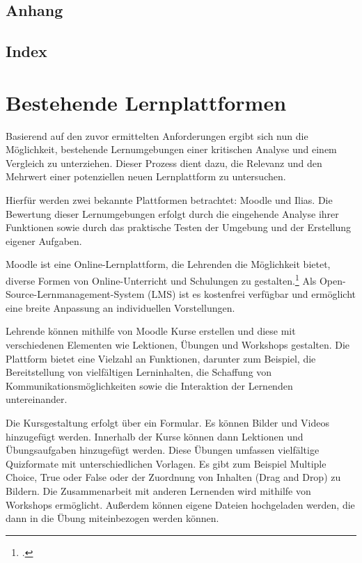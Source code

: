 \subsection{Anhang}
\subsection{Index}

\section{Bestehende Lernplattformen}
Basierend auf den zuvor ermittelten Anforderungen ergibt sich nun die Möglichkeit, bestehende Lernumgebungen einer kritischen Analyse und einem Vergleich zu unterziehen. Dieser Prozess dient dazu, die Relevanz und den Mehrwert einer potenziellen neuen Lernplattform zu untersuchen.

Hierfür werden zwei bekannte Plattformen betrachtet: Moodle und Ilias.
Die Bewertung dieser Lernumgebungen erfolgt durch die eingehende Analyse ihrer Funktionen sowie durch das praktische Testen der Umgebung und der Erstellung eigener Aufgaben.

Moodle ist eine Online-Lernplattform, die Lehrenden die Möglichkeit bietet, diverse Formen von Online-Unterricht und Schulungen zu gestalten.\footcite[Vgl.][]{moodle}{}{}
Als Open-Source-Lernmanagement-System (LMS) ist es kostenfrei verfügbar und ermöglicht eine breite Anpassung an individuellen Vorstellungen.

Lehrende können mithilfe von Moodle Kurse erstellen und diese mit verschiedenen Elementen wie Lektionen, Übungen und Workshops gestalten. Die Plattform bietet eine Vielzahl an Funktionen, darunter zum Beispiel, die Bereitstellung von vielfältigen Lerninhalten, die Schaffung von Kommunikationsmöglichkeiten sowie die Interaktion der Lernenden untereinander.

Die Kursgestaltung erfolgt über ein Formular. Es können Bilder und Videos hinzugefügt werden. Innerhalb der Kurse können dann Lektionen und Übungsaufgaben hinzugefügt werden.
Diese Übungen umfassen vielfältige Quizformate mit unterschiedlichen Vorlagen. Es gibt zum Beispiel Multiple Choice, True oder False oder der Zuordnung von Inhalten (Drag and Drop) zu Bildern. Die Zusammenarbeit mit anderen Lernenden wird mithilfe von Workshops ermöglicht. Außerdem können eigene Dateien hochgeladen werden, die dann in die Übung miteinbezogen werden können. 

